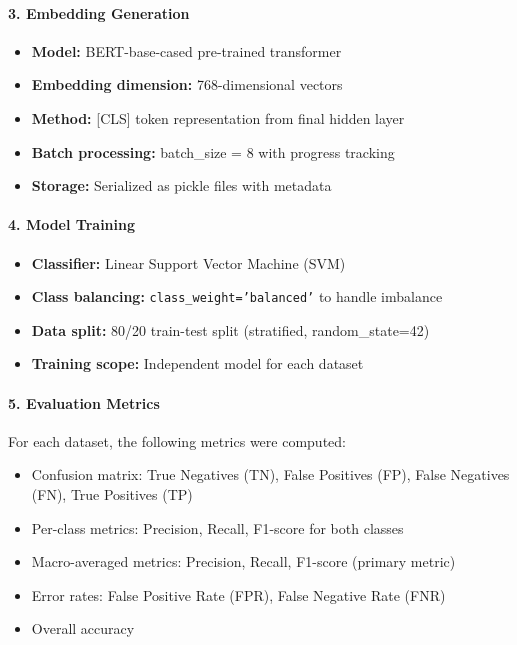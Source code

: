\documentclass[11pt, titlepage, bibliography=totoc]{scrreprt}
\begin{document}
\paragraph{3. Embedding Generation}
\begin{itemize}
    \item \textbf{Model:} BERT-base-cased pre-trained transformer
    \item \textbf{Embedding dimension:} 768-dimensional vectors
    \item \textbf{Method:} [CLS] token representation from final hidden layer
    \item \textbf{Batch processing:} batch\_size = 8 with progress tracking
    \item \textbf{Storage:} Serialized as pickle files with metadata
\end{itemize}

\paragraph{4. Model Training}
\begin{itemize}
    \item \textbf{Classifier:} Linear Support Vector Machine (SVM)
    \item \textbf{Class balancing:} \texttt{class\_weight='balanced'} to handle imbalance
    \item \textbf{Data split:} 80/20 train-test split (stratified, random\_state=42)
    \item \textbf{Training scope:} Independent model for each dataset
\end{itemize}

\paragraph{5. Evaluation Metrics}
For each dataset, the following metrics were computed:
\begin{itemize}
    \item Confusion matrix: True Negatives (TN), False Positives (FP), False Negatives (FN), True Positives (TP)
    \item Per-class metrics: Precision, Recall, F1-score for both classes
    \item Macro-averaged metrics: Precision, Recall, F1-score (primary metric)
    \item Error rates: False Positive Rate (FPR), False Negative Rate (FNR)
    \item Overall accuracy
\end{itemize}
\end{document}
